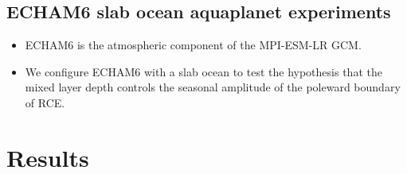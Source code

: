 \documentclass{ametsocV5}
\begin{document}
\subsection{ECHAM6 slab ocean aquaplanet experiments}
\begin{itemize}
  \item ECHAM6 is the atmospheric component of the MPI-ESM-LR GCM.
  \item We configure ECHAM6 with a slab ocean to test the hypothesis that the mixed layer depth controls the seasonal amplitude of the poleward boundary of RCE.
\end{itemize}

\section{Results} \label{sec:results}
\end{document}
